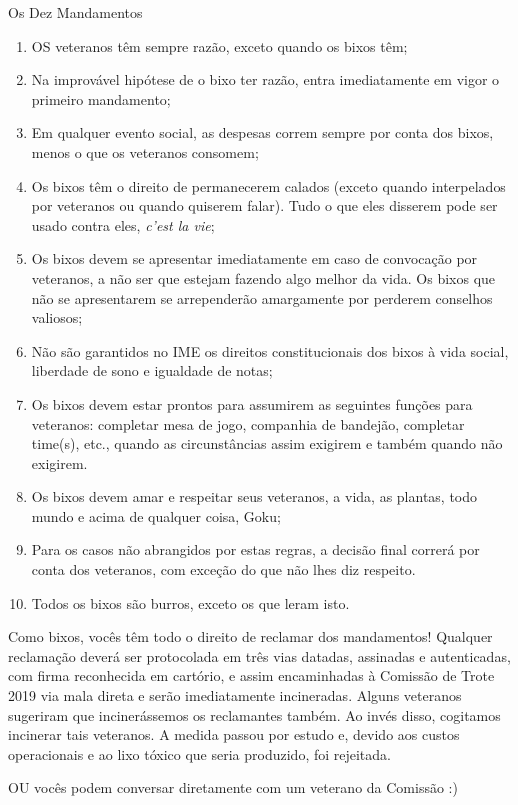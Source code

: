 \begin{editorial}{Os Dez Mandamentos}

\begin{enumerate}
  \item OS veteranos têm sempre razão, exceto quando os bixos têm;
  \item Na improvável hipótese de o bixo ter razão, entra imediatamente em vigor
        o primeiro mandamento;
  \item Em qualquer evento social, as despesas correm sempre por conta dos
        bixos, menos o que os veteranos consomem;
  \item Os bixos têm o direito de permanecerem calados (exceto quando
        interpelados por veteranos ou quando quiserem falar). Tudo o que eles
        disserem pode ser usado contra eles, \textit{c’est la vie};
  \item Os bixos devem se apresentar imediatamente em caso de convocação por
        veteranos, a não ser que estejam fazendo algo melhor da vida. Os bixos
        que não se apresentarem se arrependerão amargamente por perderem
        conselhos valiosos; %
  \item Não são garantidos no IME os direitos constitucionais dos bixos à vida
        social, liberdade de sono e igualdade de notas;
  \item Os bixos devem estar prontos para assumirem as seguintes funções para
        veteranos: completar mesa de jogo, companhia de bandejão, completar
        time(s), etc., quando as circunstâncias assim exigirem e também quando
        não exigirem.
  \item Os bixos devem amar e respeitar seus veteranos, a vida, as plantas,
        todo mundo e acima de qualquer coisa, Goku;
  \item Para os casos não abrangidos por estas regras, a decisão final correrá
        por conta dos veteranos, com exceção do que não lhes diz respeito.
  \item Todos os bixos são burros, exceto os que leram isto.
\end{enumerate}

Como bixos, vocês têm todo o direito de reclamar dos mandamentos! Qualquer
reclamação deverá ser protocolada em três vias datadas, assinadas e
autenticadas, com firma reconhecida em cartório, e assim encaminhadas à
Comissão de Trote 2019 %
via mala direta e serão imediatamente incineradas. Alguns veteranos sugeriram
que incinerássemos os reclamantes também. Ao invés disso, cogitamos incinerar
tais veteranos. A medida passou por estudo e, devido aos custos operacionais e
ao lixo tóxico que seria produzido, foi rejeitada.

OU vocês podem conversar diretamente com um veterano da Comissão :)

\end{editorial}
